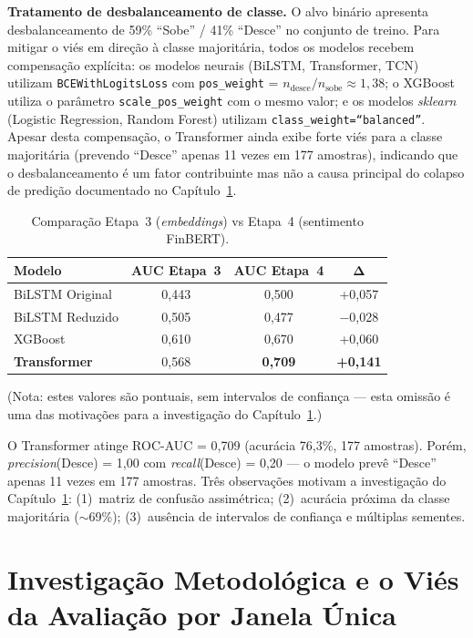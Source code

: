 \documentclass[
    12pt,
    openright,
    oneside,
    a4paper,
    english,
    brazil
]{abntex2}
\begin{document}
\textbf{Tratamento de desbalanceamento de classe.} O alvo binário apresenta desbalanceamento de 59\% ``Sobe'' / 41\% ``Desce'' no conjunto de treino. Para mitigar o viés em direção à classe majoritária, todos os modelos recebem compensação explícita: os modelos neurais (BiLSTM, Transformer, TCN) utilizam \texttt{BCEWithLogitsLoss} com \texttt{pos\_weight} = $n_\text{desce} / n_\text{sobe} \approx 1{,}38$; o XGBoost utiliza o parâmetro \texttt{scale\_pos\_weight} com o mesmo valor; e os modelos \textit{sklearn} (Logistic Regression, Random Forest) utilizam \texttt{class\_weight=``balanced''}. Apesar desta compensação, o Transformer ainda exibe forte viés para a classe majoritária (prevendo ``Desce'' apenas 11 vezes em 177 amostras), indicando que o desbalanceamento é um fator contribuinte mas não a causa principal do colapso de predição documentado no Capítulo~\ref{cap:investigacao}.

\begin{table}[htb]
\centering
\caption{Comparação Etapa~3 (\textit{embeddings}) vs Etapa~4 (sentimento FinBERT).}\label{tab:etapa4}
\begin{tabular}{lccc}
\toprule
\textbf{Modelo} & \textbf{AUC Etapa~3} & \textbf{AUC Etapa~4} & $\boldsymbol{\Delta}$ \\
\midrule
BiLSTM Original  & 0,443 & 0,500 & +0,057 \\
BiLSTM Reduzido  & 0,505 & 0,477 & $-$0,028 \\
XGBoost          & 0,610 & 0,670 & +0,060 \\
\textbf{Transformer} & 0,568 & \textbf{0,709} & \textbf{+0,141} \\
\bottomrule
\end{tabular}
\end{table}

(Nota: estes valores são pontuais, sem intervalos de confiança --- esta omissão é uma das motivações para a investigação do Capítulo~\ref{cap:investigacao}.)

O Transformer atinge ROC-AUC = 0,709 (acurácia 76,3\%, 177 amostras). Porém, \textit{precision}(Desce) = 1,00 com \textit{recall}(Desce) = 0,20 --- o modelo prevê ``Desce'' apenas 11 vezes em 177 amostras. Três observações motivam a investigação do Capítulo~\ref{cap:investigacao}: (1)~matriz de confusão assimétrica; (2)~acurácia próxima da classe majoritária ($\sim$69\%); (3)~ausência de intervalos de confiança e múltiplas sementes.


\chapter{Investigação Metodológica e o Viés da Avaliação por Janela Única}\label{cap:investigacao}
\end{document}
